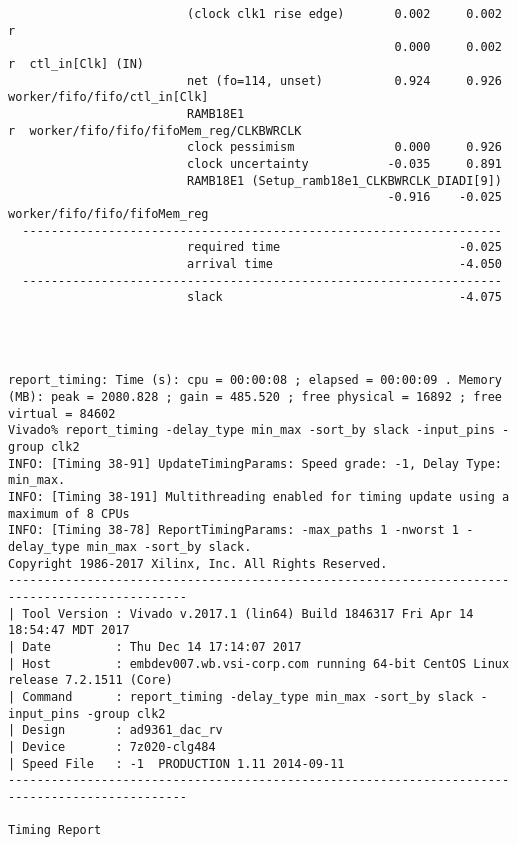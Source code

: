 \documentclass{article}
\begin{document}
\begin{lstlisting}
                         (clock clk1 rise edge)       0.002     0.002 r  
                                                      0.000     0.002 r  ctl_in[Clk] (IN)
                         net (fo=114, unset)          0.924     0.926    worker/fifo/fifo/ctl_in[Clk]
                         RAMB18E1                                     r  worker/fifo/fifo/fifoMem_reg/CLKBWRCLK
                         clock pessimism              0.000     0.926    
                         clock uncertainty           -0.035     0.891    
                         RAMB18E1 (Setup_ramb18e1_CLKBWRCLK_DIADI[9])
                                                     -0.916    -0.025    worker/fifo/fifo/fifoMem_reg
  -------------------------------------------------------------------
                         required time                         -0.025    
                         arrival time                          -4.050    
  -------------------------------------------------------------------
                         slack                                 -4.075    




report_timing: Time (s): cpu = 00:00:08 ; elapsed = 00:00:09 . Memory (MB): peak = 2080.828 ; gain = 485.520 ; free physical = 16892 ; free virtual = 84602
Vivado% report_timing -delay_type min_max -sort_by slack -input_pins -group clk2
INFO: [Timing 38-91] UpdateTimingParams: Speed grade: -1, Delay Type: min_max.
INFO: [Timing 38-191] Multithreading enabled for timing update using a maximum of 8 CPUs
INFO: [Timing 38-78] ReportTimingParams: -max_paths 1 -nworst 1 -delay_type min_max -sort_by slack.
Copyright 1986-2017 Xilinx, Inc. All Rights Reserved.
-----------------------------------------------------------------------------------------------
| Tool Version : Vivado v.2017.1 (lin64) Build 1846317 Fri Apr 14 18:54:47 MDT 2017
| Date         : Thu Dec 14 17:14:07 2017
| Host         : embdev007.wb.vsi-corp.com running 64-bit CentOS Linux release 7.2.1511 (Core)
| Command      : report_timing -delay_type min_max -sort_by slack -input_pins -group clk2
| Design       : ad9361_dac_rv
| Device       : 7z020-clg484
| Speed File   : -1  PRODUCTION 1.11 2014-09-11
-----------------------------------------------------------------------------------------------

Timing Report


\end{lstlisting}
\end{document}
